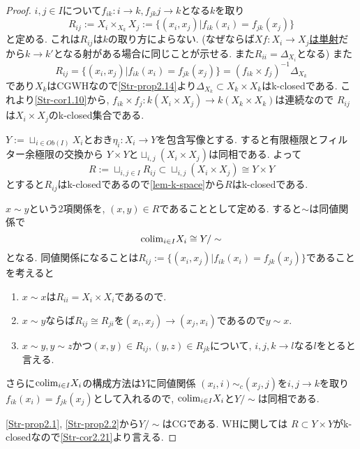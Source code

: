 \documentclass[dvipdfmx,a4paper,11pt]{article}
\newcommand{\colim}{{\rm colim}}
\theoremstyle{definition}
\begin{document}
\begin{proof}


$i,j \in I$について$f_{ik}:i \to k, f_{jk}j \to k$となる$k$を取り
$$
R_{ij}:= X_{i} \times_{X_{k}} X_{j} := \{ (x_i, x_j) | f_{ik}(x_i) = f_{jk}(x_j)\}
$$
と定める. 
これは$R_{ij}$は$k$の取り方によらない. 
(なぜならば\underline{$Xf : X_i \to X_j$は単射}だから$k \to k'$となる射がある場合に同じことが示せる. また$R_{ii}= \Delta_{X_i}$となる)
また
$$
R_{ij}=\{ (x_i, x_j) | f_{ik}(x_i) = f_{jk}(x_j)\} = (f_{ik} \times f_{j})^{-1}\Delta_{X_k}
$$
であり$X_k$はCGWHなので\ref{Str-prop2.14}より$\Delta_{X_{k}} \subset X_k \times X_k$はk-closedである.
これより\ref{Str-cor1.10}から, $f_{ik} \times f_{j} : k(X_i \times X_j) \to k(X_k \times X_k)$は連続なので
$R_{ij}$は$X_i \times X_j$のk-closed集合である. 

$Y :=\sqcup_{i \in Ob(I)}X_{i}$とおき$\eta_i : X_i \to Y$を包含写像とする. 
すると有限極限とフィルター余極限の交換から
$Y \times Y $と$ \sqcup_{i,j} (X_i \times X_j) $は同相である. 
よって
$$
R := \sqcup_{i,j \in I}R_{ij} \subset \sqcup_{i,j} (X_i \times X_j)  \cong Y \times Y
$$
とすると$R_{ij}$はk-closedであるので\ref{lem-k-space}から$R$はk-closedである. 

$x \sim y$という2項関係を, $(x,y) \in R$であることとして定める. 
すると$\sim$は同値関係で
$$
\colim_{i \in I}X_i  \cong Y/\sim
$$ 
となる.
同値関係になることは$R_{ij}:= \{ (x_i, x_j) | f_{ik}(x_i) = f_{jk}(x_j)\}$であることを考えると
\begin{enumerate}
\item  $x \sim x$は$R_{ii}=X_{i} \times X_{i}$であるので. 
\item $x \sim y$ならば$R_{ij} \cong R_{ji}$を$(x_i, x_j) \to (x_j, x_i)$であるので$y \sim x$. 
\item $x \sim y, y \sim z$かつ$(x,y) \in R_{ij}, (y,z) \in R_{jk}$について, $i,j,k \to l$なる$l$をとると言える. 
\end{enumerate}
さらに$\colim_{i \in I}X_i  $の構成方法は$Y$に同値関係
$(x_i, i)\sim_{c} (x_j, j)$を$i,j \to k$を取り$f_{ik}(x_i) = f_{jk}(x_j)$として入れるので, $\colim_{i \in I}X_i $と$Y/\sim$は同相である.

\ref{Str-prop2.1}, \ref{Str-prop2.2}から$Y/\sim$はCGである.
WHに関しては
$R \subset Y \times Y$がk-closedなので\ref{Str-cor2.21}より言える.
\end{proof}
\end{document}
